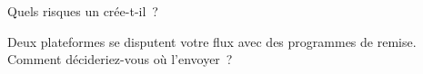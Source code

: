 \begin{interviewq}\label{iq:fm:commercial-relationships-with-venues-brokers-and-vendors:5}
Quels risques un  crée-t-il~?
\end{interviewq}

\begin{interviewq}\label{iq:fm:commercial-relationships-with-venues-brokers-and-vendors:6}
Deux plateformes se disputent votre flux avec des programmes de remise. Comment décideriez-vous où l'envoyer~?
\end{interviewq}
